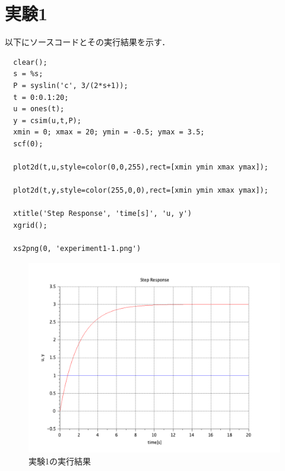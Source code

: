 \documentclass[a4paper,11pt]{jsarticle}
\begin{document}
\section{実験1}
以下にソースコードとその実行結果を示す．
\begin{lstlisting}
  clear();
  s = %s;
  P = syslin('c', 3/(2*s+1));
  t = 0:0.1:20;
  u = ones(t);
  y = csim(u,t,P);
  xmin = 0; xmax = 20; ymin = -0.5; ymax = 3.5;
  scf(0);
  
  plot2d(t,u,style=color(0,0,255),rect=[xmin ymin xmax ymax]);
  
  plot2d(t,y,style=color(255,0,0),rect=[xmin ymin xmax ymax]);
  
  xtitle('Step Response', 'time[s]', 'u, y')
  xgrid();
  
  xs2png(0, 'experiment1-1.png')  
\end{lstlisting}
\begin{figure}[H]
  \centering
  \includegraphics[width=0.8\linewidth]{picture/experiment1-1.png}
  \caption{実験1の実行結果}
  \label{1}
\end{figure}
\end{document}
